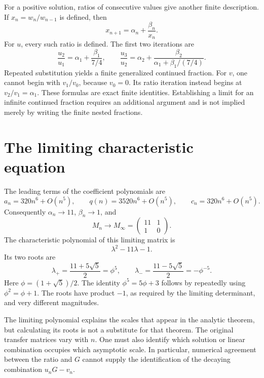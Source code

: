 For a positive solution, ratios of consecutive values give another finite
description. If $x_n=w_n/w_{n-1}$ is defined, then
\[
 x_{n+1}=\alpha_n+\frac{\beta_n}{x_n}.
\]
For $u$, every such ratio is defined. The first two iterations are
\[
 \frac{u_2}{u_1}=\alpha_1+\frac{\beta_1}{7/4},\qquad
 \frac{u_3}{u_2}=
 \alpha_2+\frac{\beta_2}{\alpha_1+\beta_1/(7/4)}.
\]
Repeated substitution yields a finite generalized continued fraction.
For $v$, one cannot begin with $v_1/v_0$, because $v_0=0$. Its ratio
iteration instead begins at $v_2/v_1=\alpha_1$. These formulas are exact
finite identities. Establishing a limit for an infinite continued fraction
requires an additional argument and is not implied merely by writing the
finite nested fractions.

\section{The limiting characteristic equation}

The leading terms of the coefficient polynomials are
\[
 a_n=320n^6+O(n^5),\qquad
 q(n)=3520n^6+O(n^5),\qquad
 c_n=320n^6+O(n^5).
\]
Consequently $\alpha_n\to11$, $\beta_n\to1$, and
\[
 M_n\longrightarrow M_\infty=\begin{pmatrix}11&1\\1&0\end{pmatrix}.
\]
The characteristic polynomial of this limiting matrix is
\begin{equation}\label{cb_eq_characteristic}
 \lambda^2-11\lambda-1.
\end{equation}
Its two roots are
\begin{equation}\label{cb_eq_characteristic_roots}
 \lambda_+=\frac{11+5\sqrt5}{2}=\phi^5,\qquad
 \lambda_-=\frac{11-5\sqrt5}{2}=-\phi^{-5}.
\end{equation}
Here $\phi=(1+\sqrt5)/2$. The identity $\phi^5=5\phi+3$ follows by
repeatedly using $\phi^2=\phi+1$. The roots have product $-1$, as required
by the limiting determinant, and very different magnitudes.

The limiting polynomial explains the scales that appear in the analytic
theorem, but calculating its roots is not a substitute for that theorem.
The original transfer matrices vary with $n$. One must also identify which
solution or linear combination occupies which asymptotic scale. In
particular, numerical agreement between the ratio and $G$ cannot supply
the identification of the decaying combination $u_nG-v_n$.

